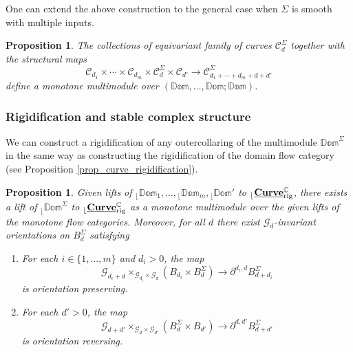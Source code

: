 \documentclass[reqno, 10pt]{amsart}
\numberwithin{equation}{section}
\numberwithin{equation}{section}
\newtheorem{prop}[thm]{Proposition}
\theoremstyle{definition}
\theoremstyle{remark}
\newcommand{\beqn}{\begin{equation*}}
\newcommand{\eeqn}{\end{equation*}}
\newcommand{\mb}{\mathbb}
\newcommand{\mc}{\mathcal}
\renewcommand{\outer}{{}_{\lfloor}}
\newcommand{\uds}[1]{\underline{\smash{#1}}}
\begin{document}
One can extend the above construction to the general case when $\Sigma$ is smooth with multiple inputs. 


\begin{prop}
The collections of equivariant family of curves ${\mc C}_{d}^\Sigma$ together with the structural maps
\beqn
{\mc C}_{d_1} \times \cdots \times {\mc C}_{d_m} \times {\mc C}_d^\Sigma \times {\mc C}_{d'} \to {\mc C}_{d_1+ \cdots + d_m + d + d'}^\Sigma
\eeqn
define a monotone multimodule over $(\mb{Dom}, \ldots, \mb{Dom}; \mb{Dom})$.
\end{prop}

\subsubsection{Rigidification and stable complex structure}

We can construct a rigidification of any outercollaring of the multimodule $\mb{Dom}^{\Sigma}$ in the same way as constructing the rigidification of the domain flow category (see Proposition \ref{prop_curve_rigidification}). 

\begin{prop}\label{prop_domain_multimodule}
Given lifts of $\outer \mb{Dom}_1, \ldots, \outer \mb{Dom}_m, \outer \mb{Dom}'$ to $\outer \uds{\bf Curve}_{\rm rig}^{\mb C}$, there exists a lift of $\outer \mb{Dom}^\Sigma$ to $\outer \uds{\bf Curve}_{\rm rig}^{\mb C}$ as a monotone multimodule over the given lifts of the monotone flow categories. Moreover, for all $d$ there exist ${\mc G}_d$-invariant orientations on $B_d^\Sigma$ satisfying
\begin{enumerate}
    \item For each $i \in \{1, \ldots, m\}$ and $d_i > 0$, the map
    \beqn
    {\mc G}_{d_i + d} \times_{{\mc G}_{d_i} \times {\mc G}_d} (B_{d_i} \times B_d^\Sigma) \to \partial^{d_i, d} B_{d + d_i}^\Sigma
    \eeqn
    is orientation preserving.

    \item For each $d' > 0$, the map
    \beqn
    {\mc G}_{d + d'} \times_{{\mc G}_d \times {\mc G}_{d'}} (B_d^\Sigma \times B_{d'}) \to \partial^{d, d'} B_{d + d'}^\Sigma
    \eeqn
    is orientation reversing. 
\end{enumerate}
\end{prop}
\end{document}
